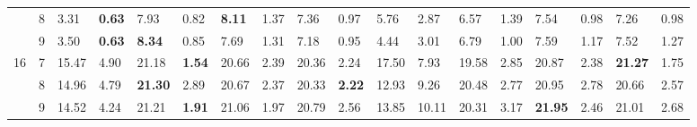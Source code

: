 \documentclass[conference]{IEEEtran}
\begin{document}
\begin{table}[]
\begin{tabular}{|cl|ll|ll|ll|ll|ll|ll|ll|ll|}
		\multicolumn{1}{|c|}{}                    & 8          & \multicolumn{1}{l|}{3.31}          & \textbf{0.63} & \multicolumn{1}{l|}{7.93}           & 0.82          & \multicolumn{1}{l|}{\textbf{8.11}}  & 1.37          & \multicolumn{1}{l|}{7.36}           & 0.97          & \multicolumn{1}{l|}{5.76}                 & 2.87  & \multicolumn{1}{l|}{6.57}  & 1.39 & \multicolumn{1}{l|}{7.54}           & 0.98          & \multicolumn{1}{l|}{7.26}           & 0.98          \\ \cline{2-18} 
		\multicolumn{1}{|c|}{}                    & 9          & \multicolumn{1}{l|}{3.50}          & \textbf{0.63} & \multicolumn{1}{l|}{\textbf{8.34}}  & 0.85          & \multicolumn{1}{l|}{7.69}           & 1.31          & \multicolumn{1}{l|}{7.18}           & 0.95          & \multicolumn{1}{l|}{4.44}                 & 3.01  & \multicolumn{1}{l|}{6.79}  & 1.00 & \multicolumn{1}{l|}{7.59}           & 1.17          & \multicolumn{1}{l|}{7.52}           & 1.27          \\ \hline
		\multicolumn{1}{|c|}{\multirow{3}{*}{16}} & 7          & \multicolumn{1}{l|}{15.47}         & 4.90          & \multicolumn{1}{l|}{21.18}          & \textbf{1.54} & \multicolumn{1}{l|}{20.66}          & 2.39          & \multicolumn{1}{l|}{20.36}          & 2.24          & \multicolumn{1}{l|}{17.50}                & 7.93  & \multicolumn{1}{l|}{19.58} & 2.85 & \multicolumn{1}{l|}{20.87}          & 2.38          & \multicolumn{1}{l|}{\textbf{21.27}} & 1.75          \\ \cline{2-18} 
		\multicolumn{1}{|c|}{}                    & 8          & \multicolumn{1}{l|}{14.96}         & 4.79          & \multicolumn{1}{l|}{\textbf{21.30}} & 2.89          & \multicolumn{1}{l|}{20.67}          & 2.37          & \multicolumn{1}{l|}{20.33}          & \textbf{2.22} & \multicolumn{1}{l|}{12.93}                & 9.26  & \multicolumn{1}{l|}{20.48} & 2.77 & \multicolumn{1}{l|}{20.95}          & 2.78          & \multicolumn{1}{l|}{20.66}          & 2.57          \\ \cline{2-18} 
		\multicolumn{1}{|c|}{}                    & 9          & \multicolumn{1}{l|}{14.52}         & 4.24          & \multicolumn{1}{l|}{21.21}          & \textbf{1.91} & \multicolumn{1}{l|}{21.06}          & 1.97          & \multicolumn{1}{l|}{20.79}          & 2.56          & \multicolumn{1}{l|}{13.85}                & 10.11 & \multicolumn{1}{l|}{20.31} & 3.17 & \multicolumn{1}{l|}{\textbf{21.95}} & 2.46          & \multicolumn{1}{l|}{21.01}          & 2.68          \\ \hline

\end{tabular}
\end{table}
\end{document}
